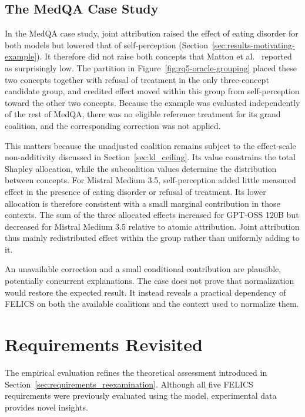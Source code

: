 \subsection{The MedQA Case Study}
\label{sec:motivating_example_discussion}

In the MedQA case study, joint attribution raised the effect of eating disorder for both models but lowered that of self-perception (Section~\ref{sec:results-motivating-example}). It therefore did not raise both concepts that Matton et al.~\cite{mattonWalkTalkMeasuring2024} reported as surprisingly low. The partition in Figure~\ref{fig:rq5-oracle-grouping} placed these two concepts together with refusal of treatment in the only three-concept candidate group, and credited effect moved within this group from self-perception toward the other two concepts. Because the example was evaluated independently of the rest of MedQA, there was no eligible reference treatment for its grand coalition, and the corresponding correction was not applied.

This matters because the unadjusted coalition remains subject to the effect-scale non-additivity discussed in Section~\ref{sec:kl_ceiling}. Its value constrains the total Shapley allocation, while the subcoalition values determine the distribution between concepts. For Mistral Medium 3.5, self-perception added little measured effect in the presence of eating disorder or refusal of treatment. Its lower allocation is therefore consistent with a small marginal contribution in those contexts. The sum of the three allocated effects increased for GPT-OSS 120B but decreased for Mistral Medium 3.5 relative to atomic attribution. Joint attribution thus mainly redistributed effect within the group rather than uniformly adding to it.

An unavailable correction and a small conditional contribution are plausible, potentially concurrent explanations. The case does not prove that normalization would restore the expected result. It instead reveals a practical dependency of FELICS on both the available coalitions and the context used to normalize them.

\section{Requirements Revisited}
\label{sec:requirements_revisited}
The empirical evaluation refines the theoretical assessment introduced in Section~\ref{sec:requirements_reexamination}. Although all five FELICS requirements were previously evaluated using the model, experimental data provides novel insights.

